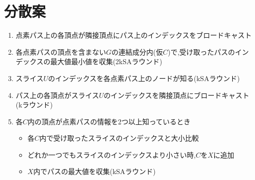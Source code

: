 \documentclass{jarticle}
\theoremstyle{definition}
\begin{document}
\newpage

\section*{分散案}
\begin{enumerate}
  \item 点素パス上の各頂点が隣接頂点にパス上のインデックスをブロードキャスト
  \item 各点素パスの頂点を含まない$G$の連結成分内(仮$C$)で,受け取ったパスのインデックスの最大値最小値を収集(2kSAラウンド)
  \item スライス$U$のインデックスを各点素パス上のノードが知る(kSAラウンド)
  \item パス上の各頂点がスライス$U$のインデックスを隣接頂点にブロードキャスト(kラウンド)
  \item 各$C$内の頂点が点素パスの情報を2つ以上知っているとき
  \begin{itemize}
    \item 各$C$内で受け取ったスライスのインデックスと大小比較
    \item どれか一つでもスライスのインデックスより小さい時,$C$を$X$に追加
    \item $X$内でパスの最大値を収集(kSAラウンド)
  \end{itemize}  
\end{enumerate}
\end{document}
